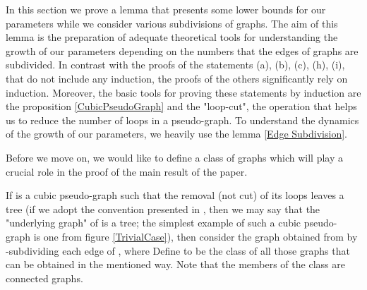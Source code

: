 \documentclass[fleqn,12pt,twoside]{article}
\begin{document}
In this section we prove a lemma that presents some lower bounds for
our parameters while we consider various subdivisions of graphs. The
aim of this lemma is the preparation of adequate theoretical tools
for understanding the growth of our parameters depending on the
numbers that the edges of graphs are subdivided. In contrast with
the proofs of the statements (a), (b), (c), (h), (i), that do not
include any induction, the proofs of the others significantly rely
on induction. Moreover, the basic tools for proving these statements
by induction are the proposition \ref{CubicPseudoGraph} and the
"loop-cut", the operation that helps us to reduce the number of
loops in a pseudo-graph. To understand the dynamics of the growth of
our parameters, we heavily use the lemma \ref{Edge Subdivision}.

Before we move on, we would like to define a class of graphs which
will play a crucial role in the proof of the main result of the
paper.

If  is a cubic pseudo-graph such that the removal (not cut)
of its loops leaves a tree (if we adopt the convention presented in
\cite{Harary}, then we may say that the "underlying graph" of
 is a tree; the simplest example of such a cubic pseudo-graph
is one from figure \ref{TrivialCase}), then consider the graph 
obtained from  by -subdividing each edge  of
, where
Define  to be the class of all those graphs  that
can be
obtained in the mentioned way. Note that the members of the class  are connected graphs.
\end{document}
